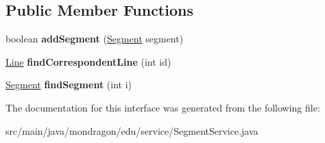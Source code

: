 \subsection*{Public Member Functions}
\begin{DoxyCompactItemize}
\item 
\mbox{\label{interfacemondragon_1_1edu_1_1service_1_1_segment_service_a23e2fee80f4625174883085d0ba97952}} 
boolean {\bfseries add\+Segment} (\mbox{\hyperlink{classmondragon_1_1edu_1_1clases_1_1_segment}{Segment}} segment)
\item 
\mbox{\label{interfacemondragon_1_1edu_1_1service_1_1_segment_service_a2813e6eecddd8213dfc6d1260830fb82}} 
\mbox{\hyperlink{classmondragon_1_1edu_1_1clases_1_1_line}{Line}} {\bfseries find\+Correspondent\+Line} (int id)
\item 
\mbox{\label{interfacemondragon_1_1edu_1_1service_1_1_segment_service_a68b629e1d3f5ccf6d279386428f66d5a}} 
\mbox{\hyperlink{classmondragon_1_1edu_1_1clases_1_1_segment}{Segment}} {\bfseries find\+Segment} (int i)
\end{DoxyCompactItemize}


The documentation for this interface was generated from the following file\+:\begin{DoxyCompactItemize}
\item 
src/main/java/mondragon/edu/service/Segment\+Service.\+java\end{DoxyCompactItemize}
